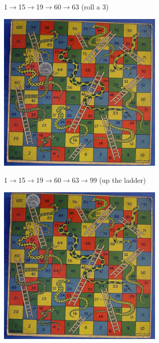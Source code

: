 \documentclass{beamer}
\begin{document}
\begin{frame}{1$\rightarrow$15$\rightarrow$19$\rightarrow$60$\rightarrow$63 (roll a 3)}
  \begin{center}
    \includegraphics[width=8cm]{game63.jpg}
  \end{center}
    \vfill
\tiny{}
\end{frame}


\begin{frame}{1$\rightarrow$15$\rightarrow$19$\rightarrow$60$\rightarrow$63$\rightarrow$99 (up the ladder)}
  \begin{center}
    \includegraphics[width=8cm]{game99.jpg}
  \end{center}
    \vfill
\tiny{}
\end{frame}
\end{document}
